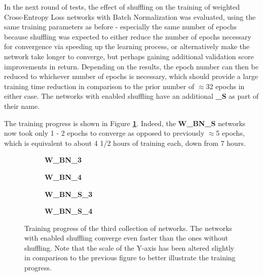 In the next round of tests, the effect of shuffling on the training of weighted Cross-Entropy Loss networks with Batch Normalization was evaluated, using the same training parameters as before - especially the same number of epochs because shuffling was expected to either reduce the number of epochs necessary for convergence via speeding up the learning process, or alternatively make the network take longer to converge, but perhaps gaining additional validation score improvements in return. Depending on the results, the epoch number can then be reduced to whichever number of epochs is necessary, which should provide a large training time reduction in comparison to the prior number of $\approx$32 epochs in either case. The networks with enabled shuffling have an additional \textbf{\_S} as part of their name.

The training progress is shown in Figure \textbf{\ref{fig:weighted_batchnorm_shuffle_training}}. Indeed, the \textbf{W\_BN\_S} networks now took only 1 - 2 epochs to converge as opposed to previously $\approx$5 epochs, which is equivalent to about 4 1/2 hours of training each, down from 7 hours.

\begin {figure}[!htb]
	\begin {subfigure}[b]{0.4\linewidth}
		\scalebox{0.65}{}
		\caption{\textbf{W\_BN\_3}}
	\end {subfigure}\hspace{1.75cm}
	\begin {subfigure}[b]{0.4\linewidth}
		\scalebox{0.65}{}
		\caption{\textbf{W\_BN\_4}}
	\end {subfigure}

	\begin {subfigure}[b]{0.4\linewidth}
		\scalebox{0.65}{}
		\caption{\textbf{W\_BN\_S\_3}}
	\end {subfigure}\hspace{1.75cm}
	\begin {subfigure}[b]{0.4\linewidth}
		\scalebox{0.65}{}
		\caption{\textbf{W\_BN\_S\_4}}
	\end {subfigure}

		\caption[Training progress of the third collection of networks.]{Training progress of the third collection of networks. The networks with enabled shuffling converge even faster than the ones without shuffling. Note that the scale of the Y-axis has been altered slightly in comparison to the previous figure to better illustrate the training progress.}
		\label{fig:weighted_batchnorm_shuffle_training}
\end {figure}


